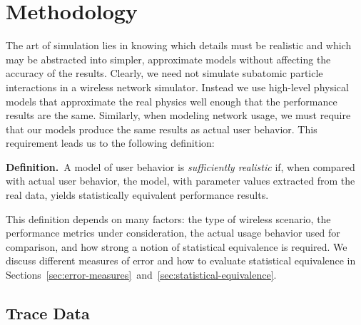\documentclass[conference]{IEEEtran}
\begin{document}

\section{Methodology}\label{sec:methodology}

The art of simulation lies in knowing which details must be realistic and which may be abstracted into simpler, approximate models without affecting the accuracy of the results. Clearly, we need not simulate subatomic particle interactions in a wireless network simulator. Instead we use high-level physical models that approximate the real physics well enough that the performance results are the same. Similarly, when modeling network usage, we must require that our models produce the same results as actual user behavior. This requirement leads us to the following definition:

\vspace{0.5em}
\begin{samepage}
\noindent\textbf{Definition.}~A model of user behavior is \textit{sufficiently realistic} if, when compared with actual user behavior, the model, with parameter values extracted from the real data, yields statistically equivalent performance results.
\end{samepage}
\vspace{0.5em}

This definition depends on many factors: the type of wireless scenario, the performance metrics under consideration, the actual usage behavior used for comparison, and how strong a notion of statistical equivalence is required. We discuss different measures of error and how to evaluate statistical equivalence in Sections~\ref{sec:error-measures}~and~\ref{sec:statistical-equivalence}.

\subsection{Trace Data}\label{sec:trace-data}
\end{document}
